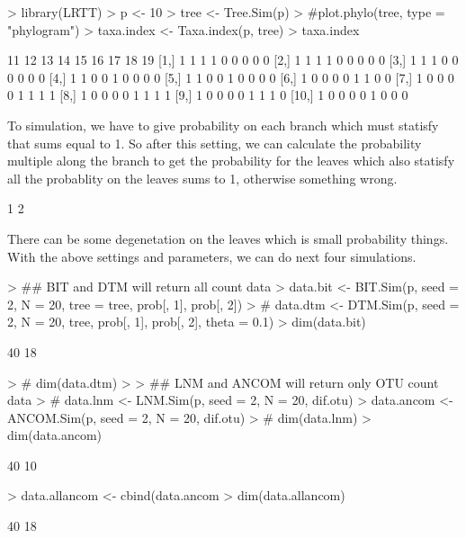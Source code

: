 \documentclass[a4paper]{article}
\begin{document}
\begin{Schunk}
\begin{Sinput}
> library(LRTT)
> p <- 10
> tree <- Tree.Sim(p)
> #plot.phylo(tree, type = "phylogram")
> taxa.index <- Taxa.index(p, tree)
> taxa.index
\end{Sinput}
\begin{Soutput}
      11 12 13 14 15 16 17 18 19
 [1,]  1  1  1  1  0  0  0  0  0
 [2,]  1  1  1  1  0  0  0  0  0
 [3,]  1  1  1  0  0  0  0  0  0
 [4,]  1  1  0  0  1  0  0  0  0
 [5,]  1  1  0  0  1  0  0  0  0
 [6,]  1  0  0  0  0  1  1  0  0
 [7,]  1  0  0  0  0  1  1  1  1
 [8,]  1  0  0  0  0  1  1  1  1
 [9,]  1  0  0  0  0  1  1  1  0
[10,]  1  0  0  0  0  1  0  0  0
\end{Soutput}
\end{Schunk}

To simulation, we have to give probability on each branch which must statisfy that sums equal to 1. So after this setting, we can calculate the probability multiple along the branch to get the probability for the leaves which also statisfy all the probablity on the leaves sums to 1, otherwise something wrong.

\begin{Schunk}
\begin{Soutput}
[1] 1 2
\end{Soutput}
\end{Schunk}

There can be some degenetation on the leaves which is small probability things. With the above settings and parameters, we can do next four simulations.

\begin{Schunk}
\begin{Sinput}
> ## BIT and DTM will return all count data
> data.bit <- BIT.Sim(p, seed = 2, N = 20, tree = tree, prob[, 1], prob[, 2])
> # data.dtm <- DTM.Sim(p, seed = 2, N = 20, tree, prob[, 1], prob[, 2], theta = 0.1)
> dim(data.bit)
\end{Sinput}
\begin{Soutput}
[1] 40 18
\end{Soutput}
\begin{Sinput}
> # dim(data.dtm)
> 
> ## LNM and ANCOM will return only OTU count data
> # data.lnm <- LNM.Sim(p, seed = 2, N = 20, dif.otu)
> data.ancom <- ANCOM.Sim(p, seed = 2, N = 20, dif.otu)
> # dim(data.lnm)
> dim(data.ancom)
\end{Sinput}
\begin{Soutput}
[1] 40 10
\end{Soutput}
\begin{Sinput}
> data.allancom <- cbind(data.ancom %*% taxa.index[, -1], data.ancom)
> dim(data.allancom)
\end{Sinput}
\begin{Soutput}
[1] 40 18
\end{Soutput}
\end{Schunk}
\end{document}
